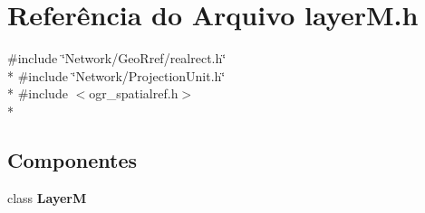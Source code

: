 \section{Referência do Arquivo layer\+M.\+h}
\label{layer_m_8h}
{\ttfamily \#include \char`\"{}Network/\+Geo\+Rref/realrect.\+h\char`\"{}}\\*
{\ttfamily \#include \char`\"{}Network/\+Projection\+Unit.\+h\char`\"{}}\\*
{\ttfamily \#include $<$ogr\+\_\+spatialref.\+h$>$}\\*
\subsection*{Componentes}
\begin{DoxyCompactItemize}
\item 
class {\bf LayerM}
\end{DoxyCompactItemize}
